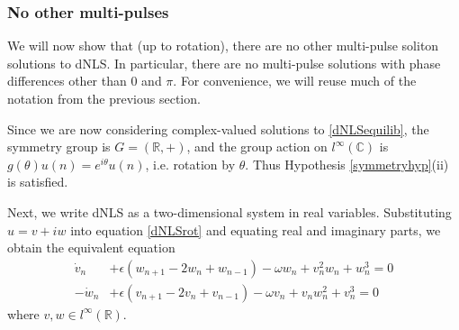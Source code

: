 \documentclass[12pt]{article}
\def\R{{\mathbb R}}
\def\C{{\mathbb C}}
\begin{document}
\subsubsection{No other multi-pulses}

We will now show that (up to rotation), there are no other multi-pulse soliton solutions to dNLS. In particular, there are no multi-pulse solutions with phase differences other than $0$ and $\pi$. For convenience, we will reuse much of the notation from the previous section. 

Since we are now considering complex-valued solutions to \eqref{dNLSequilib}, the symmetry group is $G = (\R, +)$, and the group action on $l^\infty(\C)$ is $g(\theta)u(n) = e^{i \theta}u(n)$, i.e. rotation by $\theta$. Thus Hypothesis \ref{symmetryhyp}(ii) is satisfied.

Next, we write dNLS as a two-dimensional system in real variables. Substituting $u = v + i w$ into equation \eqref{dNLSrot} and equating real and imaginary parts, we obtain the equivalent equation
\begin{equation}\label{dNLSreal}
\begin{aligned}
\dot{v}_n  &+ \epsilon (w_{n+1} - 2 w_n + w_{n-1}) - \omega w_n + v_n^2 w_n + w_n^3 = 0 \\
-\dot{w}_n &+ \epsilon (v_{n+1} - 2 v_n + v_{n-1}) - \omega v_n + v_n w_n^2 + v_n^3 = 0
\end{aligned}
\end{equation}
where $v, w \in l^\infty(\R)$. 
\end{document}
